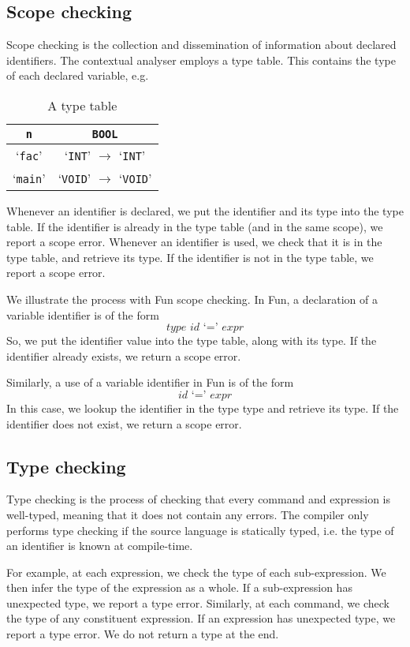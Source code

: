 \documentclass[a4paper, openany]{memoir}
\begin{document}
\subsection{Scope checking}
Scope checking is the collection and dissemination of information about declared identifiers. The contextual analyser employs a type table. This contains the type of each declared variable, e.g.
\begin{table}[H]
    \centering
    \begin{tabular}{c|c}
        \texttt{n} & \texttt{BOOL} \\
        \hline
        `\texttt{fac}' & `\texttt{INT}' $\to$ `\texttt{INT}' \\
        `\texttt{main}' & `\texttt{VOID}' $\to$ `\texttt{VOID}'
    \end{tabular}
    \caption{A type table}
\end{table}

Whenever an identifier is declared, we put the identifier and its type into the type table. If the identifier is already in the type table (and in the same scope), we report a scope error. Whenever an identifier is used, we check that it is in the type table, and retrieve its type. If the identifier is not in the type table, we report a scope error.

We illustrate the process with Fun scope checking. In Fun, a declaration of a variable identifier is of the form
\[\textit{type id } \text{`}\texttt{=}\text{'} \textit{ expr}\]
So, we put the identifier value into the type table, along with its type. If the identifier already exists, we return a scope error.

Similarly, a use of a variable identifier in Fun is of the form
\[\textit{id } \text{`}\texttt{=}\text{'} \textit{ expr}\]
In this case, we lookup the identifier in the type type and retrieve its type. If the identifier does not exist, we return a scope error.

\subsection{Type checking}
Type checking is the process of checking that every command and expression is well-typed, meaning that it does not contain any errors. The compiler only performs type checking if the source language is statically typed, i.e. the type of an identifier is known at compile-time.

For example, at each expression, we check the type of each sub-expression. We then infer the type of the expression as a whole. If a sub-expression has unexpected type, we report a type error. Similarly, at each command, we check the type of any constituent expression. If an expression has unexpected type, we report a type error. We do not return a type at the end.
\end{document}
